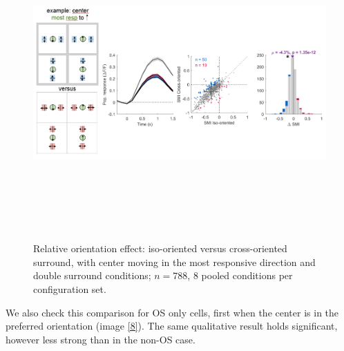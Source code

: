 \begin{figure}[H] \centering \includegraphics[width=12cm,height=12cm,keepaspectratio]{Figures/7.Results/finalPopulation/sel/diagrams/7.png} 
\caption{Relative orientation effect: iso-oriented versus cross-oriented surround, with center moving in the most responsive direction and double surround conditions;  $n=788$, 8 pooled conditions per configuration set.} 
\label{7}
\end{figure}

We also check this comparison for OS only cells, first when the center is in the preferred orientation (image \ref{8}). The same qualitative result holds significant, however less strong than in the non-OS case.

